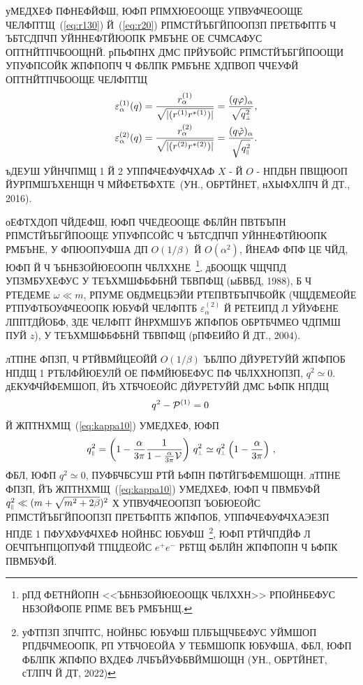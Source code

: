 \documentclass[koi8-r]{pazh2col}
\def\mprp{\mbox{\tiny $\bot$}}
\def\mprl{\mbox{\tiny $\|$}}
\def\beq{\begin{eqnarray}}
\def\eeq{\end{eqnarray}}
\def\beq{\begin{eqnarray}}
\def\eeq{\end{eqnarray}}
\begin{document}
  уМЕДХЕФ ПФНЕФЙФШ, ЮФП РПМХЮЕООЩЕ УПВУФЧЕООЩЕ ЧЕЛФПТЩ~(\ref{eq:r130}) Й~(\ref{eq:r20}) РПМСТЙЪБГЙПООПЗП 
ПРЕТБФПТБ Ч ЪБТСДПЧП УЙННЕФТЙЮОПК РМБЪНЕ ОЕ СЧМСАФУС ОПТНЙТПЧБООЩНЙ. рПЬФПНХ ДМС ПРЙУБОЙС 
РПМСТЙЪБГЙПООЩИ УПУФПСОЙК ЖПФПОПЧ Ч ФБЛПК РМБЪНЕ ХДПВОП ЧЧЕУФЙ ОПТНЙТПЧБООЩЕ ЧЕЛФПТЩ
%
\beq
\label{eq:epsilon}
&&\varepsilon_\alpha^{(1)}(q) = \frac{r^{(1)}_{\alpha}}{\sqrt{|(r^{(1)} r^{*(1)})|}} = 
\frac{(q \varphi)_\alpha}{\sqrt{q_{\mprp}^2}},
\\
\nonumber
&&\varepsilon_\alpha^{(2)}(q) = \frac{r^{(2)}_{\alpha}}{\sqrt{|(r^{(2)} r^{*(2)})|}} = 
\frac{(q \tilde \varphi)_\alpha}{\sqrt{q_{\mprl}^2}}.
\eeq
%
\noindent ъДЕУШ УЙНЧПМЩ 1 Й 2 УППФЧЕФУФЧХАФ  
$X$ - Й $O$ -  НПДБН ПВЩЮОП ЙУРПМШЪХЕНЩН Ч МЙФЕТБФХТЕ~(УН., ОБРТЙНЕТ, нХЫФХЛПЧ Й ДТ., 2016).  

 оЕФТХДОП ЧЙДЕФШ, ЮФП ЧЧЕДЕООЩЕ ФБЛЙН ПВТБЪПН РПМСТЙЪБГЙПООЩЕ УПУФПСОЙС Ч ЪБТСДПЧП УЙННЕФТЙЮОПК 
РМБЪНЕ,  У ФПЮОПУФША ДП $O(1/\beta)$ Й $O(\alpha^2)$, ЙНЕАФ ФПФ ЦЕ ЧЙД, ЮФП Й Ч  ЪБНБЗОЙЮЕООПН 
ЧБЛХХНЕ~\footnote{рПД ФЕТНЙОПН <<ЪБНБЗОЙЮЕООЩК ЧБЛХХН>>  
РПОЙНБЕФУС НБЗОЙФОПЕ РПМЕ ВЕЪ РМБЪНЩ.}. дБООЩК ЧЩЧПД УПЗМБУХЕФУС У ТЕЪХМШФБФБНЙ ТБВПФЩ 
(ыБВБД, 1988), Б Ч РТЕДЕМЕ $\omega \ll m$, РПУМЕ ОБДМЕЦБЭЙИ РТЕПВТБЪПЧБОЙК (ЧЩДЕМЕОЙЕ РТПУФТБОУФЧЕООПК 
ЮБУФЙ ЧЕЛФПТБ $\varepsilon^{(2)}_\alpha$ Й РЕТЕИПД Л УЙУФЕНЕ ЛППТДЙОБФ, ЗДЕ ЧЕЛФПТ ЙНРХМШУБ ЖПФПОБ 
ОБРТБЧМЕО ЧДПМШ ПУЙ $z$), У ТЕЪХМШФБФБНЙ ТБВПФЩ (рПФЕИЙО Й ДТ., 2004). 

лТПНЕ ФПЗП, Ч РТЙВМЙЦЕОЙЙ $O(1/\beta)$ ЪБЛПО ДЙУРЕТУЙЙ ЖПФПОБ НПДЩ 1 РТБЛФЙЮЕУЛЙ ОЕ ПФМЙЮБЕФУС 
ПФ ЧБЛХХНОПЗП, $q^2 \simeq 0$. дЕКУФЧЙФЕМШОП, ЙЪ ХТБЧОЕОЙС ДЙУРЕТУЙЙ ДМС ЬФПК НПДЩ
%
\beq
q^2 - {\cal P}^{(1)} = 0 \, 
\label{disper1}
\eeq
\noindent Й ЖПТНХМЩ~(\ref{eq:kappa10}) УМЕДХЕФ, ЮФП 
%
\beq
q_{\mprl}^2 = \left (1- \frac{\alpha}{3\pi} \frac{1}{1-\frac{\alpha}{3\pi} \cal V} \right) \, q_{\mprp}^2  
\simeq q_{\mprp}^2 \left (1- \frac{\alpha}{3\pi} \right)\, , 
\label{disper12}
\eeq
\noindent ФБЛ, ЮФП  $q^2 \simeq 0$, 
ПУФБЧБСУШ РТЙ ЬФПН ПФТЙГБФЕМШОЩН. лТПНЕ ФПЗП, ЙЪ ЖПТНХМЩ~(\ref{eq:kappa10}) УМЕДХЕФ, ЮФП Ч 
ПВМБУФЙ $q^2_{\mprl} \ll (m+\sqrt{m^2+2 \beta})^2$ Х УПВУФЧЕООПЗП ЪОБЮЕОЙС РПМСТЙЪБГЙПООПЗП 
ПРЕТБФПТБ ЖПФПОБ, УППФЧЕФУФЧХАЭЕЗП НПДЕ 1 ПФУХФУФЧХЕФ НОЙНБС ЮБУФШ~\footnote{уФТПЗП ЗПЧПТС, НОЙНБС ЮБУФШ 
ПЛБЪЩЧБЕФУС УЙМШОП РПДБЧМЕООПК,  РП УТБЧОЕОЙА У ТЕБМШОПК ЮБУФША, ФБЛ, ЮФП ФБЛПК ЖПФПО ВХДЕФ ЛЧБЪЙУФБВЙМШОЩН 
(УН., ОБРТЙНЕТ, сТЛПЧ Й ДТ, 2022)}, ЮФП РТЙЧПДЙФ Л ОЕЧПЪНПЦОПУФЙ 
ТПЦДЕОЙС $e^+e^-$ РБТЩ  ФБЛЙН ЖПФПОПН Ч ЬФПК ПВМБУФЙ.  
\end{document}
